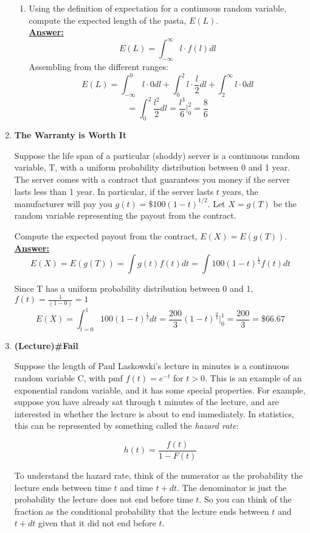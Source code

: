 \documentclass[12pt,a4paper]{article}
\numberwithin{equation}{subsection}
\begin{document}
\begin{enumerate}
\begin{enumerate}
\item Using the definition of expectation for a continuous random variable, compute the expected length of the pasta, $E(L)$.
\\
\textbf{\underline{Answer:}}
\\
$$E(L) = \int_{-\infty}^{\infty} l \cdot f(l) dl$$
Assembling from the different ranges:
$$E(L) = \int_{-\infty}^{0} l \cdot 0 dl + \int_{0}^{2} l \cdot \frac{l}{2} dl + \int_{2}^{\infty} l \cdot 0 dl $$
$$ = \int_{0}^{2} \frac{l^2}{2} dl = \frac{l^3}{6}\bigg|_0^2= \frac{8}{6} $$
\end{enumerate}

\item \textbf{The Warranty is Worth It}

Suppose the life span of a particular (shoddy) server is a continuous random variable, T, with a uniform probability distribution between 0 and 1 year.  The server comes with a contract that guarantees you money if the server lasts less than 1 year.  In particular, if the server lasts $t$ years, the manufacturer will pay you $g(t)= \$100(1-t)^{1/2}$.  Let $X = g(T)$ be the random variable representing the payout from the contract.

Compute the expected payout from the contract, $E(X) = E(g(T))$.
\\
\textbf{\underline{Answer:}}
\\
$$ E(X) = E(g(T)) = \int g(t)f(t) dt  =  \int 100 (1 - t)^\frac{1}{2} f(t)dt$$

Since T has a uniform probability distribution between 0 and 1, $f(t)=\frac{1}{(1-0)} = 1$
$$E(X) = \int_{t=0}^1 100 (1 - t)^\frac{1}{2}dt = \frac{200}{3}(1-t)^{\frac{3}{2}} \bigg|_0^1=\frac{200}{3}=\$66.67$$

\item \textbf{(Lecture)\#Fail}

Suppose the length of Paul Laskowski's lecture in minutes is a continuous random variable C, with pmf $f(t) = e^{-t}$ for $t > 0$.  This is an example of an exponential random variable, and it has some special properties.  For example, suppose you have already sat through t minutes of the lecture, and are interested in whether the lecture is about to end immediately.  In statistics, this can be represented by something called the \textit{hazard rate}:

$$h(t) = \frac{f(t)}{1-F(t)}$$

To understand the hazard rate, think of the numerator as the probability the lecture ends between time $t$ and time $t+ dt$.  The denominator is just the probability the lecture does not end before time $t$.  So you can think of the fraction as the conditional probability that the lecture ends between $t$ and $t + dt$ given that it did not end before $t$.


\end{enumerate}
\end{document}

